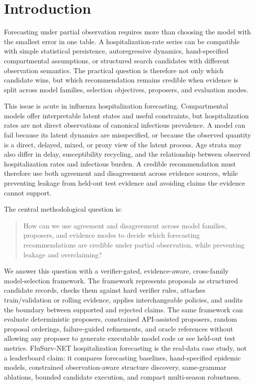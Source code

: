 \section{Introduction}

Forecasting under partial observation requires more than choosing the model
with the smallest error in one table. A hospitalization-rate series can be
compatible with simple statistical persistence, autoregressive dynamics,
hand-specified compartmental assumptions, or structured search candidates with
different observation semantics. The practical question is therefore not only
which candidate wins, but which recommendation remains credible when evidence
is split across model families, selection objectives, proposers, and
evaluation modes.

This issue is acute in influenza hospitalization forecasting. Compartmental
models offer interpretable latent states and useful constraints, but
hospitalization rates are not direct observations of canonical infectious
prevalence. A model can fail because its latent dynamics are misspecified, or
because the observed quantity is a direct, delayed, mixed, or proxy view of the
latent process. Age strata may also differ in delay, susceptibility recycling,
and the relationship between observed hospitalization rates and infectious
burden. A credible recommendation must therefore use both agreement and
disagreement across evidence sources, while preventing leakage from held-out
test evidence and avoiding claims the evidence cannot support.

The central methodological question is:
\begin{quote}
How can we use agreement and disagreement across model families, proposers,
and evidence modes to decide which forecasting recommendations are credible
under partial observation, while preventing leakage and overclaiming?
\end{quote}

We answer this question with a verifier-gated, evidence-aware, cross-family
model-selection framework. The framework represents proposals as structured
candidate records, checks them against hard verifier rules, attaches
train/validation or rolling evidence, applies interchangeable policies, and
audits the boundary between supported and rejected claims. The same framework
can evaluate deterministic proposers, constrained API-assisted proposers,
random proposal orderings, failure-guided refinements, and oracle references
without allowing any proposer to generate executable model code or see
held-out test metrics. FluSurv-NET hospitalization forecasting is the real-data
case study, not a leaderboard claim: it compares forecasting baselines,
hand-specified epidemic models, constrained observation-aware structure
discovery, same-grammar ablations, bounded candidate execution, and compact
multi-season robustness.

